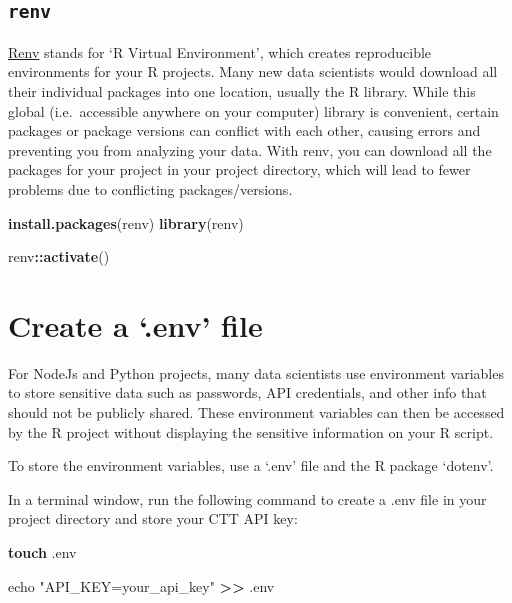 \documentclass[
]{book}
\newenvironment{Shaded}{\begin{snugshade}}{\end{snugshade}}
\newcommand{\BuiltInTok}[1]{#1}
\newcommand{\FunctionTok}[1]{\textcolor[rgb]{0.13,0.29,0.53}{\textbf{#1}}}
\newcommand{\NormalTok}[1]{#1}
\newcommand{\OperatorTok}[1]{\textcolor[rgb]{0.81,0.36,0.00}{\textbf{#1}}}
\newcommand{\SpecialCharTok}[1]{\textcolor[rgb]{0.81,0.36,0.00}{\textbf{#1}}}
\newcommand{\StringTok}[1]{\textcolor[rgb]{0.31,0.60,0.02}{#1}}
\begin{document}
\subsection{\texorpdfstring{\texttt{renv}}{renv}}\label{renv}

\href{https://rstudio.github.io/renv/articles/renv.html}{Renv} stands for `R Virtual Environment', which creates reproducible environments for your R projects. Many new data scientists would download all their individual packages into one location, usually the R library. While this global (i.e.~accessible anywhere on your computer) library is convenient, certain packages or package versions can conflict with each other, causing errors and preventing you from analyzing your data. With renv, you can download all the packages for your project in your project directory, which will lead to fewer problems due to conflicting packages/versions.

\begin{Shaded}
\begin{Highlighting}[]
\FunctionTok{install.packages}\NormalTok{(}\StringTok{\textquotesingle{}renv\textquotesingle{}}\NormalTok{)}
\FunctionTok{library}\NormalTok{(renv)}

\NormalTok{renv}\SpecialCharTok{::}\FunctionTok{activate}\NormalTok{()}
\end{Highlighting}
\end{Shaded}

\section{Create a `.env' file}\label{create-a-.env-file}

For NodeJs and Python projects, many data scientists use environment variables to store sensitive data such as passwords, API credentials, and other info that should not be publicly shared. These environment variables can then be accessed by the R project without displaying the sensitive information on your R script.

To store the environment variables, use a `.env' file and the R package `dotenv'.

In a terminal window, run the following command to create a .env file in your project directory and store your CTT API key:

\begin{Shaded}
\begin{Highlighting}[]
\FunctionTok{touch}\NormalTok{ .env}

\BuiltInTok{echo} \StringTok{"API\_KEY=your\_api\_key"} \OperatorTok{\textgreater{}\textgreater{}}\NormalTok{ .env}
\end{Highlighting}
\end{Shaded}
\end{document}
